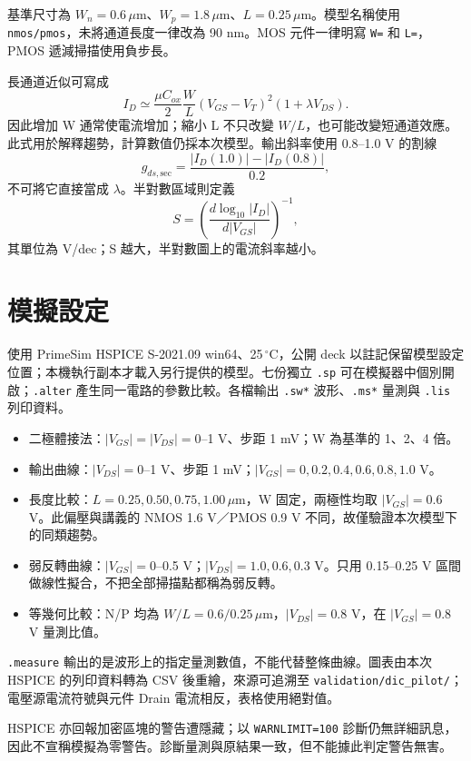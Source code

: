 基準尺寸為 $W_n=0.6\,\mu\mathrm m$、$W_p=1.8\,\mu\mathrm m$、$L=0.25\,\mu\mathrm m$。模型名稱使用 \texttt{nmos/pmos}，未將通道長度一律改為 90 nm。MOS 元件一律明寫 \texttt{W=} 和 \texttt{L=}，PMOS 遞減掃描使用負步長。

長通道近似可寫成
\[
 I_D\simeq\frac{\mu C_{ox}}{2}\frac WL(V_{GS}-V_T)^2(1+\lambda V_{DS}).
\]
因此增加 W 通常使電流增加；縮小 L 不只改變 $W/L$，也可能改變短通道效應。此式用於解釋趨勢，計算數值仍採本次模型。輸出斜率使用 0.8--1.0 V 的割線
\[
g_{ds,\mathrm{sec}}=\frac{|I_D(1.0)|-|I_D(0.8)|}{0.2},
\]
不可將它直接當成 $\lambda$。半對數區域則定義
\[
S=\left(\frac{d\log_{10}|I_D|}{d|V_{GS}|}\right)^{-1},
\]
其單位為 V/dec；S 越大，半對數圖上的電流斜率越小。

\section{模擬設定}
使用 PrimeSim HSPICE S-2021.09 win64、25\,$^\circ$C，公開 deck 以註記保留模型設定位置；本機執行副本才載入另行提供的模型。七份獨立 \texttt{.sp} 可在模擬器中個別開啟；\texttt{.alter} 產生同一電路的參數比較。各檔輸出 \texttt{.sw*} 波形、\texttt{.ms*} 量測與 \texttt{.lis} 列印資料。

\begin{itemize}
\item 二極體接法：$|V_{GS}|=|V_{DS}|=0$--1 V、步距 1 mV；W 為基準的 1、2、4 倍。
\item 輸出曲線：$|V_{DS}|=0$--1 V、步距 1 mV；$|V_{GS}|=0,0.2,0.4,0.6,0.8,1.0$ V。
\item 長度比較：$L=0.25,0.50,0.75,1.00\,\mu\mathrm m$，W 固定，兩極性均取 $|V_{GS}|=0.6$ V。此偏壓與講義的 NMOS 1.6 V／PMOS 0.9 V 不同，故僅驗證本次模型下的同類趨勢。
\item 弱反轉曲線：$|V_{GS}|=0$--0.5 V；$|V_{DS}|=1.0,0.6,0.3$ V。只用 0.15--0.25 V 區間做線性擬合，不把全部掃描點都稱為弱反轉。
\item 等幾何比較：N/P 均為 $W/L=0.6/0.25\,\mu\mathrm m$，$|V_{DS}|=0.8$ V，在 $|V_{GS}|=0.8$ V 量測比值。
\end{itemize}
\texttt{.measure} 輸出的是波形上的指定量測數值，不能代替整條曲線。圖表由本次 HSPICE 的列印資料轉為 CSV 後重繪，來源可追溯至 \texttt{validation/dic\_pilot/}；電壓源電流符號與元件 Drain 電流相反，表格使用絕對值。

HSPICE 亦回報加密區塊的警告遭隱藏；以 \texttt{WARNLIMIT=100} 診斷仍無詳細訊息，因此不宣稱模擬為零警告。診斷量測與原結果一致，但不能據此判定警告無害。

